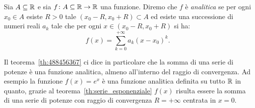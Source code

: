 \begin{definition}
%
Sia $A\subseteq {\mathbb R}$ e sia $f\colon A\subseteq {\mathbb R} \to {\mathbb R}$ una funzione. 
Diremo che
$f$ è \emph{analitica} se per ogni $x_0\in A$ esiste $R>0$ 
tale $(x_0-R,x_0+R)\subset A$ ed esiste una successione
di numeri reali $a_k$ tale che per ogni 
$x\in (x_0-R,x_0+R)$ si ha:
\[
  f(x) = \sum_{k=0}^{+\infty} a_k (x-x_0)^k.
\]
\end{definition}

Il teorema~\ref{th:488456367} ci dice in particolare che la somma di una serie
di potenze è una funzione analitica, almeno all'interno del raggio di convergenza.
Ad esempio la funzione $f(x)=e^x$ è una funzione 
analitica definita su tutto ${\mathbb R}$ in quanto, 
grazie al teorema~\ref{th:serie_esponenziale} 
$f(x)$ risulta essere la somma di una serie di potenze
con raggio di convergenza $R=+\infty$ centrata in $x=0$.

